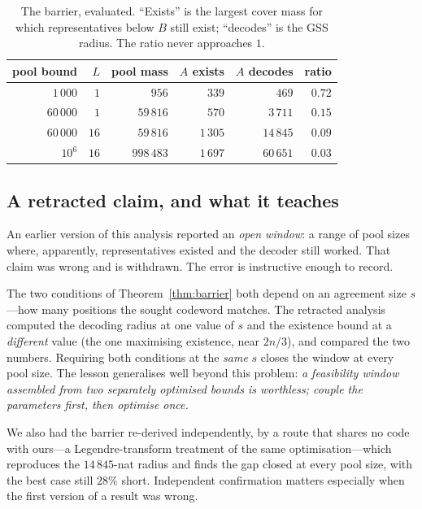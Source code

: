 \begin{table}[h]
\centering\small
\caption{The barrier, evaluated. ``Exists'' is the largest cover mass for which
representatives below $B$ still exist; ``decodes'' is the GSS radius. The ratio
never approaches $1$.}\label{tab:barrier}
\begin{tabular}{rrrrrr}
\toprule
pool bound & $L$ & pool mass & $A$ exists & $A$ decodes & ratio\\
\midrule
$1\,000$ & $1$ & $956$ & $339$ & $469$ & $0.72$\\
$60\,000$ & $1$ & $59\,816$ & $570$ & $3\,711$ & $0.15$\\
$60\,000$ & $16$ & $59\,816$ & $1\,305$ & $14\,845$ & $0.09$\\
$10^{6}$ & $16$ & $998\,483$ & $1\,697$ & $60\,651$ & $0.03$\\
\bottomrule
\end{tabular}
\end{table}

\subsection{A retracted claim, and what it teaches}\label{sec:retraction}

An earlier version of this analysis reported an \emph{open window}: a range of
pool sizes where, apparently, representatives existed and the decoder still
worked. That claim was wrong and is withdrawn. The error is instructive enough
to record.

The two conditions of Theorem~\ref{thm:barrier} both depend on an agreement
size $s$---how many positions the sought codeword matches. The retracted
analysis computed the decoding radius at one value of $s$ and the existence
bound at a \emph{different} value (the one maximising existence, near $2n/3$),
and compared the two numbers. Requiring both conditions at the \emph{same} $s$
closes the window at every pool size. The lesson generalises well beyond this
problem: \emph{a feasibility window assembled from two separately optimised
bounds is worthless; couple the parameters first, then optimise once.}

We also had the barrier re-derived independently, by a route that shares no
code with ours---a Legendre-transform treatment of the same optimisation---which
reproduces the $14\,845$-nat radius and finds the gap closed at every pool size,
with the best case still $28\%$ short. Independent confirmation matters
especially when the first version of a result was wrong.

